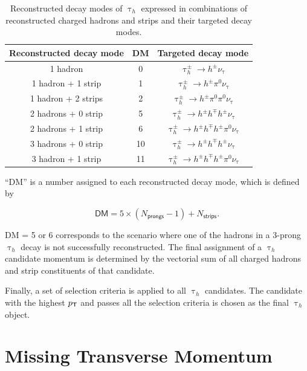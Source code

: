 \begin{table}[th]
\sffamily
\centering
\caption{Reconstructed decay modes of $\uptau_h$ expressed in combinations of reconstructed charged hadrons and strips and their targeted decay modes.}
\begin{tabular}{ccc}
\toprule
Reconstructed decay mode & DM & Targeted decay mode \\
\midrule
1 hadron & 0 & $\uptau_{h}^{\pm}\rightarrow h^{\pm}\nu_{\uptau} $\\
1 hadron + 1 strip & 1 & $\uptau_{h}^{\pm}\rightarrow h^{\pm}\pi^{0}\nu_{\uptau} $\\
1 hadron + 2 strips & 2 & $\uptau_{h}^{\pm}\rightarrow h^{\pm}\pi^{0}\pi^{0}\nu_{\uptau} $\\
2 hadrons + 0 strip & 5 & $\uptau_{h}^{\pm}\rightarrow h^{\pm}h^{\mp}h^{\pm}\nu_{\uptau} $\\
2 hadrons + 1 strip & 6 & $\uptau_{h}^{\pm}\rightarrow h^{\pm}h^{\mp}h^{\pm}\pi^{0}\nu_{\uptau} $\\
3 hadrons + 0 strip & 10 & $\uptau_{h}^{\pm}\rightarrow h^{\pm}h^{\mp}h^{\pm}\nu_{\uptau} $\\
3 hadron + 1 strip & 11 & $\uptau_{h}^{\pm}\rightarrow h^{\pm}h^{\mp}h^{\pm}\pi^{0}\nu_{\uptau} $\\
\bottomrule
\end{tabular}
\label{tab:DM}
\end{table}

``DM'' is a number assigned to each reconstructed decay mode, which is defined by 

\begin{equation}
\textsf{DM} = 5\times(N_{\textsf{prongs}}-1)+N_{\textsf{strips}}.
\end{equation}

DM = 5 or 6 corresponds to the scenario where one of the hadrons in a 3-prong $\uptau_h$ decay is not successfully reconstructed. The final assignment of a $\uptau_h$ candidate momentum is determined by the vectorial sum of all charged hadrons and strip constituents of that candidate. 

Finally, a set of selection criteria is applied to all $\uptau_h$ candidates. The candidate with the highest $p_{\textsf{T}}$ and passes all the selection criteria is chosen as the final $\uptau_h$ object. 

\section{Missing Transverse Momentum}
\label{sec:MET}

